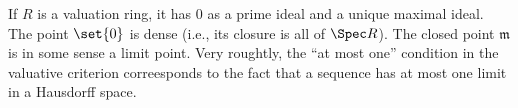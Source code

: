 If $R$ is a valuation ring, it has $0$ as a prime ideal and a unique maximal
ideal. The point $\set{0}$ is dense (i.e., its closure is all of $\Spec R$).
The closed point $\mathfrak{m}$ is in some sense a limit point. Very roughtly,
the \enquote{at most one} condition in the valuative criterion correesponds to
the fact that a sequence has at most one limit in a Hausdorff space.

